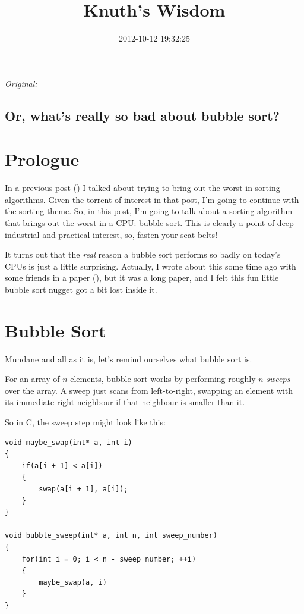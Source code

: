 \documentclass[11pt]{article}
\begin{document}
\title{Knuth's Wisdom}
\date{2012-10-12 19:32:25}
\maketitle

\noindent\textit{Original: }\texttt{}\par
\medskip
\subsection{Or, what's really so bad about bubble sort?}

\section{Prologue}

In a previous post (\texttt{}) I talked about trying to bring out the worst in sorting algorithms. Given the torrent of interest in that post, I'm going to continue with the sorting theme. So, in this post, I'm going to talk about a sorting algorithm that brings out the worst in a CPU: bubble sort. This is clearly a point of deep industrial and practical interest, so, fasten your seat belts!

It turns out that the \emph{real} reason a bubble sort performs so badly on today's CPUs is just a little surprising. Actually, I wrote about this some time ago with some friends in a paper (\texttt{}), but it was a long paper, and I felt this fun little bubble sort nugget got a bit lost inside it.
\section{Bubble Sort}

Mundane and all as it is, let's remind ourselves what bubble sort is.

For an array of $n$ elements, bubble sort works by performing roughly $n$ \emph{sweeps} over the array. A sweep just scans from left-to-right, swapping an element with its immediate right neighbour if that neighbour is smaller than it.

So in C, the sweep step might look like this:
\begin{lstlisting}
void maybe_swap(int* a, int i)
{
    if(a[i + 1] < a[i])
    {
        swap(a[i + 1], a[i]);
    }
}

void bubble_sweep(int* a, int n, int sweep_number)
{
    for(int i = 0; i < n - sweep_number; ++i)
    {
        maybe_swap(a, i)
    }
}
\end{lstlisting}
\end{document}
